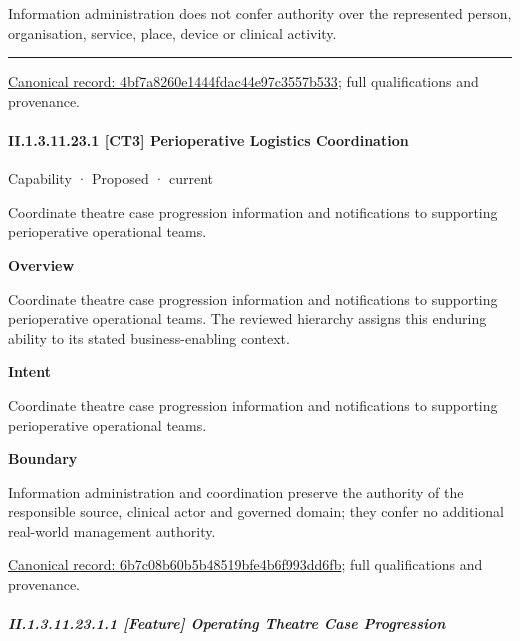 Information administration does not confer authority over the represented person, organisation, service, place, device or clinical activity.



\medskip\hrule\medskip

{\footnotesize \href{../../../../continuum/strategy/capability/4bf7a8260e1444fdac44e97c3557b533.md}{Canonical record: 4bf7a8260e1444fdac44e97c3557b533}; full qualifications and provenance.}\par
\paragraph*{II.1.3.11.23.1 [CT3] Perioperative Logistics Coordination}
\label{navigation:II.1.3.11.23.1}

\label{element:6b7c08b60b5b48519bfe4b6f993dd6fb}
{\small Capability · Proposed · current}\par

Coordinate theatre case progression information and notifications to supporting perioperative operational teams.



\textbf{Overview}



Coordinate theatre case progression information and notifications to supporting perioperative operational teams. The reviewed hierarchy assigns this enduring ability to its stated business-enabling context.



\textbf{Intent}



Coordinate theatre case progression information and notifications to supporting perioperative operational teams.



\textbf{Boundary}



Information administration and coordination preserve the authority of the responsible source, clinical actor and governed domain; they confer no additional real-world management authority.


{\footnotesize \href{../../../../continuum/strategy/capability/6b7c08b60b5b48519bfe4b6f993dd6fb.md}{Canonical record: 6b7c08b60b5b48519bfe4b6f993dd6fb}; full qualifications and provenance.}\par
\subparagraph*{II.1.3.11.23.1.1 [Feature] Operating Theatre Case Progression}
\label{navigation:II.1.3.11.23.1.1}


